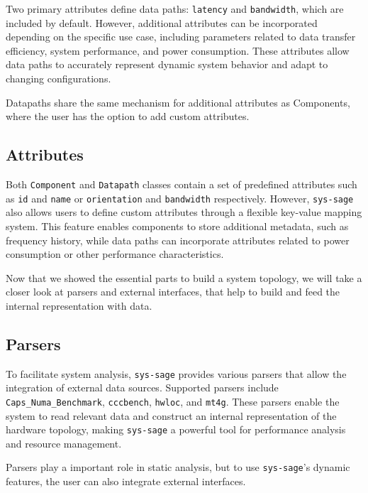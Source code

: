 Two primary attributes define data paths: \texttt{latency} and \texttt{bandwidth}, which are included by default. However, additional attributes can be incorporated depending on the specific use case, including parameters related to data transfer efficiency, system performance, and power consumption. These attributes allow data paths to accurately represent dynamic system behavior and adapt to changing configurations.\cite[see Data Path]{sys-sage-docu}

Datapaths share the same mechanism for additional attributes as Components, where the user has the option to add custom attributes.

\subsection{Attributes}

Both \texttt{Component} and \texttt{Datapath} classes contain a set of predefined attributes such as \texttt{id} and \texttt{name} or \texttt{orientation} and \texttt{bandwidth} respectively. However, \texttt{sys-sage} also allows users to define custom attributes through a flexible key-value mapping system. This feature enables components to store additional metadata, such as frequency history, while data paths can incorporate attributes related to power consumption or other performance characteristics.\cite[see Component, Datapath]{sys-sage-docu}
\smallskip

Now that we showed the essential parts to build a system topology, we will take a closer look at parsers and external interfaces, that help to build and feed the internal representation with data.

\subsection{Parsers}

To facilitate system analysis, \texttt{sys-sage} provides various parsers that allow the integration of external data sources. Supported parsers include \texttt{Caps\_Numa\_Benchmark}, \texttt{cccbench}, \texttt{hwloc}, and \texttt{mt4g}. These parsers enable the system to read relevant data and construct an internal representation of the hardware topology, making \texttt{sys-sage} a powerful tool for performance analysis and resource management.\cite[see Data Parsers Documentation]{sys-sage-docu}

\smallskip
Parsers play a important role in static analysis, but to use \texttt{sys-sage}'s dynamic features, the user can also integrate external interfaces.

